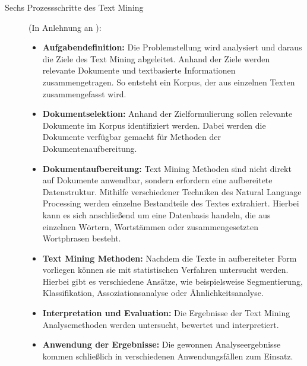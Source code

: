 \documentclass[
        ngerman,
        paper=a4,
        numbers=noendperiod,
]{scrreprt}
\begin{document}
\begin{description}
\item[Sechs Prozessschritte des Text Mining] (In Anlehnung an \cite [S. 288]{eff70}):
\begin{itemize}
\item \textbf{Aufgabendefinition:} Die Problemstellung wird analysiert und daraus die Ziele des Text Mining abgeleitet. Anhand der Ziele werden relevante Dokumente und textbasierte Informationen zusammengetragen. So entsteht ein Korpus, der aus einzelnen Texten zusammengefasst wird.
\item \textbf{Dokumentselektion:} Anhand der Zielformulierung sollen relevante Dokumente im Korpus identifiziert werden. Dabei werden die Dokumente verfügbar gemacht für Methoden der Dokumentenaufbereitung.
\item \textbf{Dokumentaufbereitung:} Text Mining Methoden sind nicht direkt auf Dokumente anwendbar, sondern erfordern eine aufbereitete Datenstruktur. Mithilfe verschiedener Techniken des Natural Language Processing werden einzelne Bestandteile des Textes extrahiert. Hierbei kann es sich anschließend um eine Datenbasis handeln, die aus einzelnen Wörtern, Wortstämmen oder zusammengesetzten Wortphrasen besteht.
\item \textbf{Text Mining Methoden:} Nachdem die Texte in aufbereiteter Form vorliegen können sie mit statistischen Verfahren untersucht werden. Hierbei gibt es verschiedene Ansätze, wie beispielsweise Segmentierung, Klassifikation, Assoziationsanalyse oder Ähnlichkeitsanalyse.
\item \textbf{Interpretation und Evaluation:} Die Ergebnisse der Text Mining Analysemethoden werden untersucht, bewertet und interpretiert.
\item \textbf{Anwendung der Ergebnisse:} Die gewonnen Analyseergebnisse kommen schließlich in verschiedenen Anwendungsfällen zum Einsatz.
\end{itemize} 
\end{description}
\end{document}
